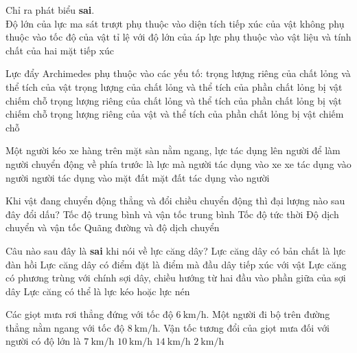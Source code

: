 \begin{ex}
	Chỉ ra phát biểu \textbf{sai}.\\
	Độ lớn của lực ma sát trượt	
	\choice
	{\True phụ thuộc vào diện tích tiếp xúc của vật}
	{không phụ thuộc vào tốc độ của vật}
	{tỉ lệ với độ lớn của áp lực}
	{phụ thuộc vào vật liệu và tính chất của hai mặt tiếp xúc}
	\loigiai{}
\end{ex}
\begin{ex}
	Lực đẩy Archimedes phụ thuộc vào các yếu tố:
	\choice
	{trọng lượng riêng của chất lỏng và thể tích của vật}
	{trọng lượng của chất lỏng và thể tích của phần chất lỏng bị vật chiếm chỗ}
	{\True trọng lượng riêng của chất lỏng và thể tích của phần chất lỏng bị vật chiếm chỗ}
	{trọng lượng riêng của vật và thể tích của phần chất lỏng bị vật chiếm chỗ}
	\loigiai{}
\end{ex}
\begin{ex}
	Một người kéo xe hàng trên mặt sàn nằm ngang, lực tác dụng lên người để làm người chuyển động về phía trước là lực mà
	\choice
	{người tác dụng vào xe}
	{xe tác dụng vào người}
	{người tác dụng vào mặt đất}
	{\True mặt đất tác dụng vào người}
	\loigiai{}
\end{ex}
\begin{ex}
	Khi vật đang chuyển động thẳng và đổi chiều chuyển động thì đại lượng nào sau đây đổi dấu?	
	\choice
	{Tốc độ trung bình và vận tốc trung bình}
	{Tốc độ tức thời}
	{\True Độ dịch chuyển và vận tốc}
	{Quãng đường và độ dịch chuyển}
	\loigiai{}
\end{ex}
\begin{ex}
	Câu nào sau đây là \textbf{sai} khi nói về lực căng dây?
	\choice
	{Lực căng dây có bản chất là lực đàn hồi}
	{Lực căng dây có điểm đặt là điểm mà đầu dây tiếp xúc với vật}
	{Lực căng có phương trùng với chính sợi dây, chiều hướng từ hai đầu vào phần giữa của sợi dây}
	{\True Lực căng có thể là lực kéo hoặc lực nén}
	\loigiai{}
\end{ex}
\begin{ex}
	Các giọt mưa rơi thẳng đứng với tốc độ $\SI{6}{\kilo\meter/\hour}$. Một người đi bộ trên đường thẳng nằm ngang với tốc độ $\SI{8}{\kilo\meter/\hour}$. Vận tốc tương đổi của giọt mưa đối với người có độ lớn là
	\choice
	{$\SI{7}{\kilo\meter/\hour}$}
	{\True $\SI{10}{\kilo\meter/\hour}$}
	{$\SI{14}{\kilo\meter/\hour}$}
	{$\SI{2}{\kilo\meter/\hour}$}
	\loigiai{}
\end{ex}
